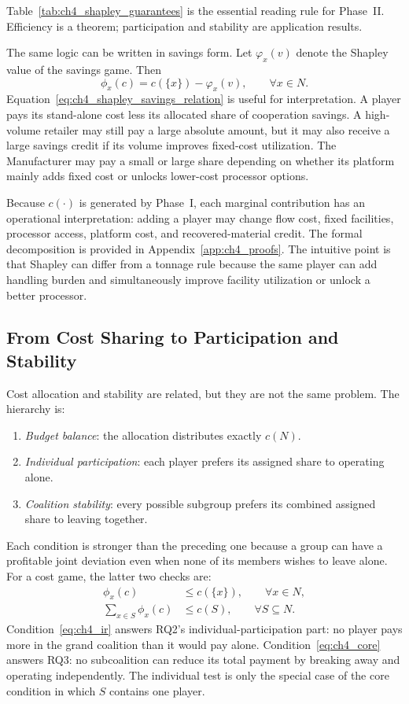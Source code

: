Table~\ref{tab:ch4_shapley_guarantees} is the essential reading rule for Phase~II. Efficiency is a theorem; participation and stability are application results.

The same logic can be written in savings form. Let $\varphi_x(v)$ denote the Shapley value of the savings game. Then
\begin{equation}
\label{eq:ch4_shapley_savings_relation}
\phi_x(c)=c(\{x\})-\varphi_x(v),
\qquad \forall x\in N.
\end{equation}
Equation~\eqref{eq:ch4_shapley_savings_relation} is useful for interpretation. A player pays its stand-alone cost less its allocated share of cooperation savings. A high-volume retailer may still pay a large absolute amount, but it may also receive a large savings credit if its volume improves fixed-cost utilization. The Manufacturer may pay a small or large share depending on whether its platform mainly adds fixed cost or unlocks lower-cost processor options.

Because $c(\cdot)$ is generated by Phase~I, each marginal contribution has an operational interpretation: adding a player may change flow cost, fixed facilities, processor access, platform cost, and recovered-material credit. The formal decomposition is provided in Appendix~\ref{app:ch4_proofs}. The intuitive point is that Shapley can differ from a tonnage rule because the same player can add handling burden and simultaneously improve facility utilization or unlock a better processor.

\subsection{From Cost Sharing to Participation and Stability}

Cost allocation and stability are related, but they are not the same problem. The hierarchy is:
\begin{enumerate}
\item \emph{Budget balance}: the allocation distributes exactly $c(N)$.
\item \emph{Individual participation}: each player prefers its assigned share to operating alone.
\item \emph{Coalition stability}: every possible subgroup prefers its combined assigned share to leaving together.
\end{enumerate}
Each condition is stronger than the preceding one because a group can have a profitable joint deviation even when none of its members wishes to leave alone. For a cost game, the latter two checks are:
\begin{align}
\label{eq:ch4_ir}
\phi_x(c)&\leq c(\{x\}),
\qquad \forall x\in N,\\
\label{eq:ch4_core}
\sum_{x\in S}\phi_x(c)&\leq c(S),
\qquad \forall S\subseteq N.
\end{align}
Condition~\eqref{eq:ch4_ir} answers RQ2's individual-participation part: no player pays more in the grand coalition than it would pay alone. Condition~\eqref{eq:ch4_core} answers RQ3: no subcoalition can reduce its total payment by breaking away and operating independently. The individual test is only the special case of the core condition in which $S$ contains one player.

